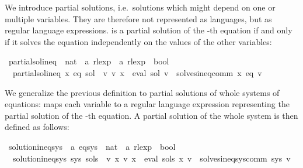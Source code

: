 \begin{isabellebody}
{}
\isamarkuptrue%
%
\endisatagdocument
{\isafolddocument}%
%
\isadelimdocument
%
\endisadelimdocument
%
\begin{isamarkuptext}%
We introduce partial solutions, i.e.\ solutions which might depend on one or multiple
variables. They are therefore not represented as languages, but as regular language expressions.
 is a partial solution of the -th equation if and only if it solves the equation
independently on the values of the other variables:%
\end{isamarkuptext}\isamarkuptrue%
\isamarkupfalse%
\ partial{\isacharunderscore}{\kern0pt}sol{\isacharunderscore}{\kern0pt}ineq\ {\isacharcolon}{\kern0pt}{\isacharcolon}{\kern0pt}\ {\isachardoublequoteopen}nat\ {\isasymRightarrow}\ {\isacharprime}{\kern0pt}a\ rlexp\ {\isasymRightarrow}\ {\isacharprime}{\kern0pt}a\ rlexp\ {\isasymRightarrow}\ bool{\isachardoublequoteclose}\ \isanewline
\ \ {\isachardoublequoteopen}partial{\isacharunderscore}{\kern0pt}sol{\isacharunderscore}{\kern0pt}ineq\ x\ eq\ sol\ {\isasymequiv}\ {\isasymforall}v{\isachardot}{\kern0pt}\ v\ x\ {\isacharequal}{\kern0pt}\ eval\ sol\ v\ {\isasymlongrightarrow}\ solves{\isacharunderscore}{\kern0pt}ineq{\isacharunderscore}{\kern0pt}comm\ x\ eq\ v{\isachardoublequoteclose}%
\begin{isamarkuptext}%
We generalize the previous definition to partial solutions of whole systems of equations:
 maps each variable  to a regular language expression representing the partial solution
of the -th equation. A partial solution of the whole system is then defined as follows:%
\end{isamarkuptext}\isamarkuptrue%
\isamarkupfalse%
\ solution{\isacharunderscore}{\kern0pt}ineq{\isacharunderscore}{\kern0pt}sys\ {\isacharcolon}{\kern0pt}{\isacharcolon}{\kern0pt}\ {\isachardoublequoteopen}{\isacharprime}{\kern0pt}a\ eq{\isacharunderscore}{\kern0pt}sys\ {\isasymRightarrow}\ {\isacharparenleft}{\kern0pt}nat\ {\isasymRightarrow}\ {\isacharprime}{\kern0pt}a\ rlexp{\isacharparenright}{\kern0pt}\ {\isasymRightarrow}\ bool{\isachardoublequoteclose}\ \isanewline
\ \ {\isachardoublequoteopen}solution{\isacharunderscore}{\kern0pt}ineq{\isacharunderscore}{\kern0pt}sys\ sys\ sols\ {\isasymequiv}\ {\isasymforall}v{\isachardot}{\kern0pt}\ {\isacharparenleft}{\kern0pt}{\isasymforall}x{\isachardot}{\kern0pt}\ v\ x\ {\isacharequal}{\kern0pt}\ eval\ {\isacharparenleft}{\kern0pt}sols\ x{\isacharparenright}{\kern0pt}\ v{\isacharparenright}{\kern0pt}\ {\isasymlongrightarrow}\ solves{\isacharunderscore}{\kern0pt}ineq{\isacharunderscore}{\kern0pt}sys{\isacharunderscore}{\kern0pt}comm\ sys\ v{\isachardoublequoteclose}%

\end{isabellebody}
